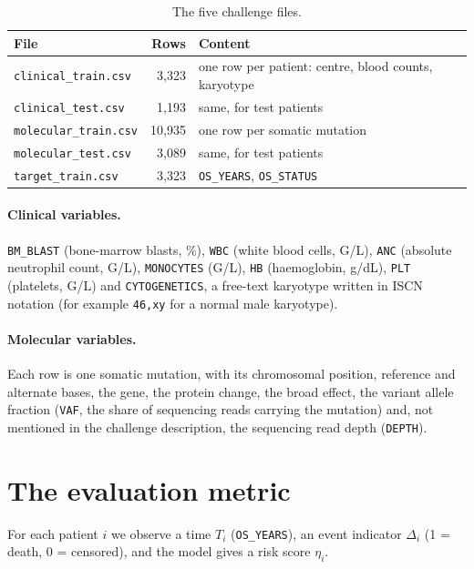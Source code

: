 \documentclass[11pt,a4paper]{article}
\begin{document}
\begin{table}[H]
\centering
\caption{The five challenge files.}
\label{tab:files}
\begin{tabular}{lrl}
\toprule
File & Rows & Content \\
\midrule
\texttt{clinical\_train.csv}  & 3{,}323  & one row per patient: centre, blood counts, karyotype \\
\texttt{clinical\_test.csv}   & 1{,}193  & same, for test patients \\
\texttt{molecular\_train.csv} & 10{,}935 & one row per somatic mutation \\
\texttt{molecular\_test.csv}  & 3{,}089  & same, for test patients \\
\texttt{target\_train.csv}    & 3{,}323  & \texttt{OS\_YEARS}, \texttt{OS\_STATUS} \\
\bottomrule
\end{tabular}
\end{table}

\paragraph{Clinical variables.}
\texttt{BM\_BLAST} (bone-marrow blasts, \%), \texttt{WBC} (white blood cells, G/L),
\texttt{ANC} (absolute neutrophil count, G/L), \texttt{MONOCYTES} (G/L),
\texttt{HB} (haemoglobin, g/dL), \texttt{PLT} (platelets, G/L) and
\texttt{CYTOGENETICS}, a free-text karyotype written in ISCN notation
(for example \texttt{46,xy} for a normal male karyotype).

\paragraph{Molecular variables.}
Each row is one somatic mutation, with its chromosomal position, reference and
alternate bases, the gene, the protein change, the broad effect, the variant allele
fraction (\texttt{VAF}, the share of sequencing reads carrying the mutation) and, not
mentioned in the challenge description, the sequencing read depth (\texttt{DEPTH}).

\section{The evaluation metric}
\label{sec:metric}
For each patient $i$ we observe a time $T_i$ (\texttt{OS\_YEARS}), an event indicator
$\Delta_i$ (1 = death, 0 = censored), and the model gives a risk score $\eta_i$.
\end{document}
